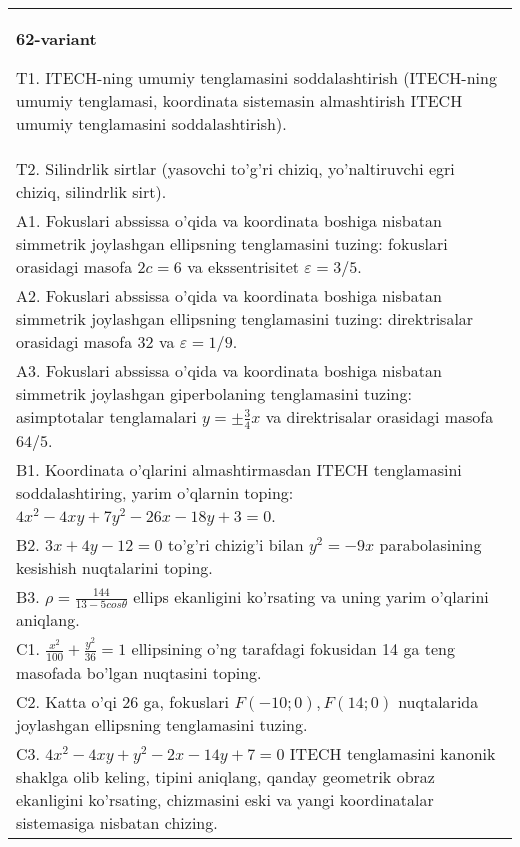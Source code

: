 \documentclass{article}
\begin{document}
\begin{tabular}{m{17cm}}
\textbf{62-variant}
\newline

T1. ITECH-ning umumiy tenglamasini soddalashtirish (ITECH-ning umumiy tenglamasi, koordinata sistemasin almashtirish ITECH umumiy tenglamasini soddalashtirish).\\

T2. Silindrlik sirtlar (yasovchi to'g'ri chiziq, yo'naltiruvchi egri chiziq, silindrlik sirt).\\

A1. Fokuslari abssissa o'qida va koordinata boshiga nisbatan simmetrik joylashgan ellipsning tenglamasini tuzing: fokuslari orasidagi masofa $2c=6$ va ekssentrisitet $\varepsilon=3/5$.\\

A2. Fokuslari abssissa o'qida va koordinata boshiga nisbatan simmetrik joylashgan ellipsning tenglamasini tuzing: direktrisalar orasidagi masofa $32$ va $\varepsilon=1/9$.\\

A3. Fokuslari abssissa o'qida va koordinata boshiga nisbatan simmetrik joylashgan giperbolaning tenglamasini tuzing: asimptotalar tenglamalari $y=\pm \frac{3}{4}x$ va direktrisalar orasidagi masofa $64/5$.\\

B1. Koordinata o'qlarini almashtirmasdan ITECH tenglamasini soddalashtiring, yarim o'qlarnin toping: $4x^{2} - 4xy + 7y^{2} - 26x - 18y + 3 = 0$.\\

B2. $3x + 4y - 12 = 0$ to'g'ri chizig'i bilan $y^{2} = - 9x$ parabolasining kesishish nuqtalarini toping.  \\

B3. $\rho = \frac{144}{13 - 5cos\theta}$ ellips ekanligini ko'rsating va uning yarim o'qlarini aniqlang.\\

C1. $\frac{x^{2}}{100} + \frac{y^{2}}{36} = 1$ ellipsining o'ng tarafdagi fokusidan 14 ga teng masofada bo'lgan nuqtasini toping.  \\

C2. Katta o'qi 26 ga, fokuslari $F( - 10;0), F(14;0)$ nuqtalarida joylashgan ellipsning tenglamasini tuzing.  \\

C3. $4x^{2} - 4xy + y^{2} - 2x - 14y + 7 = 0$ ITECH tenglamasini kanonik shaklga olib keling, tipini aniqlang, qanday geometrik obraz ekanligini ko'rsating, chizmasini eski va yangi koordinatalar sistemasiga nisbatan chizing.  \\

\end{tabular}
\vspace{1cm}
\end{document}
